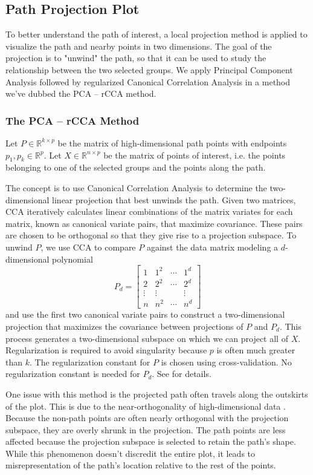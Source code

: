 \documentclass{article}
\begin{document}
\subsection{Path Projection Plot}
To better understand the path of interest, a local projection method is applied to visualize the path and nearby points in two dimensions. The goal of the projection is to "unwind" the path, so that it can be used to study the relationship between the two selected groups. We apply Principal Component Analysis followed by regularized Canonical Correlation Analysis in a method we've dubbed the PCA -- rCCA method.

\subsubsection{The PCA -- rCCA Method}
Let $P \in \mathbb{R}^{k \times p}$ be the matrix of high-dimensional path points with endpoints $p_1, p_k \in \mathbb{R}^p$. Let $X \in \mathbb{R}^{n \times p}$ be the matrix of points of interest, i.e. the points belonging to one of the selected groups and the points along the path.

The concept is to use Canonical Correlation Analysis to determine the two-dimensional linear projection that best unwinds the path. Given two matrices, CCA iteratively calculates linear combinations of the matrix variates for each matrix, known as canonical variate pairs, that maximize covariance. These pairs are chosen to be orthogonal so that they give rise to a projection subspace. To unwind $P$, we use CCA to compare $P$ against the data matrix modeling a $d$-dimensional polynomial $$P_d = \begin{bmatrix}
1 & 1^2 & \cdots & 1^d \\
2 & 2^2 & \cdots & 2^d \\
\vdots & \vdots & & \vdots \\
n & n^2 & \cdots & n^d
\end{bmatrix}$$
and use the first two canonical variate pairs to construct a two-dimensional projection that maximizes the covariance between projections of $P$ and $P_d$. This process generates a two-dimensional subspace on which we can project all of $X$. Regularization is required to avoid singularity because $p$ is often much greater than $k$. The regularization constant for $P$ is chosen using cross-validation. No regularization constant is needed for $P_d$. See \cite{rCCA} for details.

One issue with this method is the projected path often travels along the outskirts of the plot. This is due to the near-orthogonality of high-dimensional data \cite{near-orthogonal}. Because the non-path points are often nearly orthogonal with the projection subspace, they are overly shrunk in the projection. The path points are less affected because the projection subspace is selected to retain the path's shape. While this phenomenon doesn't discredit the entire plot, it leads to misrepresentation of the path's location relative to the rest of the points.
\end{document}
